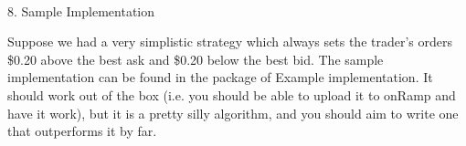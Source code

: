 \documentclass[12pt]{article}
\begin{document}
\ \\
\begin{center}8. Sample Implementation\end{center}
Suppose we had a very simplistic strategy which always sets the trader’s orders \$0.20 above the best ask and \$0.20 below the best bid. The sample implementation can be found in the package of Example implementation. It should work out of the box (i.e. you should be able to upload it to onRamp and have it work), but it is a pretty silly algorithm, and you should aim to write one that outperforms it by far.
\end{document}
